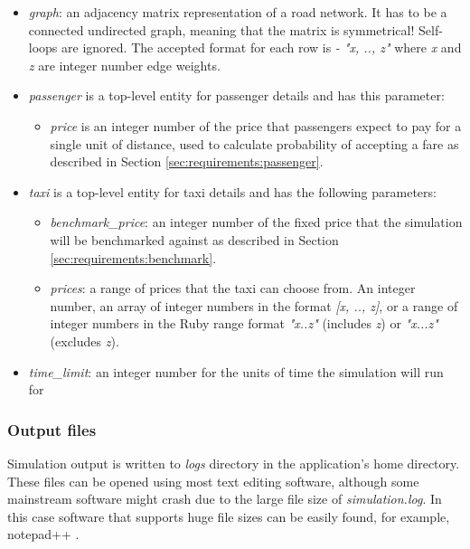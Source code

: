 \begin{itemize}
  \item \textit{graph}: an adjacency matrix representation of a road network.
        It has to be a connected undirected graph, meaning that the matrix is
        symmetrical! Self-loops are ignored. The accepted format for each row
        is \textit{- "x, .., z"} where \textit{x} and \textit{z} are integer
        number edge weights.
  \item \textit{passenger} is a top-level entity for passenger details and has
        this parameter:
        \begin{itemize} 
          \item \textit{price} is an integer number of the price that
                passengers expect to pay for a single unit of distance, used to
                calculate probability of accepting a fare as described in
                Section \ref{sec:requirements:passenger}.
        \end{itemize}
  \item \textit{taxi} is a top-level entity for taxi details and has the
        following parameters:
        \begin{itemize}
          \item \textit{benchmark\_price}: an integer number of the fixed price
          that the simulation will be benchmarked against as described in
          Section \ref{sec:requirements:benchmark}.
          \item \textit{prices}: a range of prices that the taxi can choose
          from. An integer number, an array of integer numbers in the format 
          \textit{[x, .., z]}, or a range of integer numbers in the Ruby range
          format \textit{"x..z"} (includes \textit{z}) or \textit{"x...z"}
          (excludes \textit{z}).
        \end{itemize}
  \item \textit{time\_limit}: an integer number for the units of time the
        simulation will run for
\end{itemize}


\subsubsection{Output files}

 Simulation output is written to \textit{logs}
directory in the application's home directory. These files can be opened using
most text editing software, although some mainstream software might crash due
to the large file size of \textit{simulation.log}. In this case software that
supports huge file sizes can be easily found, for example, notepad++
\parencite{Notepad++}.

